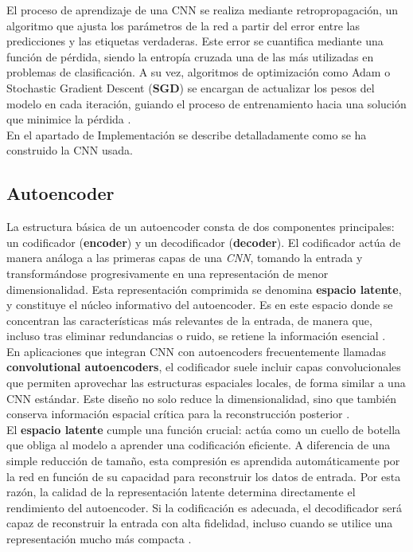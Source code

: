 \documentclass[12pt]{article} %
\begin{document}
El proceso de aprendizaje de una CNN se realiza mediante retropropagación, un algoritmo que ajusta los parámetros de la red a partir del error entre las predicciones y las etiquetas verdaderas. Este error se cuantifica mediante una función de pérdida, siendo la entropía cruzada una de las más utilizadas en problemas de clasificación. A su vez, algoritmos de optimización como Adam o Stochastic Gradient Descent (\textbf{SGD}) se encargan de actualizar los pesos del modelo en cada iteración, guiando el proceso de entrenamiento hacia una solución que minimice la pérdida \cite{kingma2014adam,rumelhart1986learning}. \\

En el apartado de Implementación se describe detalladamente como se ha construido la CNN usada.


\subsection{Autoencoder}
La estructura básica de un autoencoder consta de dos componentes principales: un codificador (\textbf{encoder}) y un decodificador (\textbf{decoder}). El codificador actúa de manera análoga a las primeras capas de una \textit{CNN}, tomando la entrada y transformándose progresivamente en una representación de menor dimensionalidad. Esta representación comprimida se denomina \textbf{espacio latente}, y constituye el núcleo informativo del autoencoder. Es en este espacio donde se concentran las características más relevantes de la entrada, de manera que, incluso tras eliminar redundancias o ruido, se retiene la información esencial \cite{bank2023autoencoders}. \\

En aplicaciones que integran CNN con autoencoders frecuentemente llamadas \textbf{convolutional autoencoders}, el codificador suele incluir capas convolucionales que permiten aprovechar las estructuras espaciales locales, de forma similar a una CNN estándar. Este diseño no solo reduce la dimensionalidad, sino que también conserva información espacial crítica para la reconstrucción posterior \cite{masci2011stacked}. \\

El \textbf{espacio latente} cumple una función crucial: actúa como un cuello de botella que obliga al modelo a aprender una codificación eficiente. A diferencia de una simple reducción de tamaño, esta compresión es aprendida automáticamente por la red en función de su capacidad para reconstruir los datos de entrada. Por esta razón, la calidad de la representación latente determina directamente el rendimiento del autoencoder. Si la codificación es adecuada, el decodificador será capaz de reconstruir la entrada con alta fidelidad, incluso cuando se utilice una representación mucho más compacta \cite{hinton2006reducing,goodfellow2016deep}. \\
\end{document}
